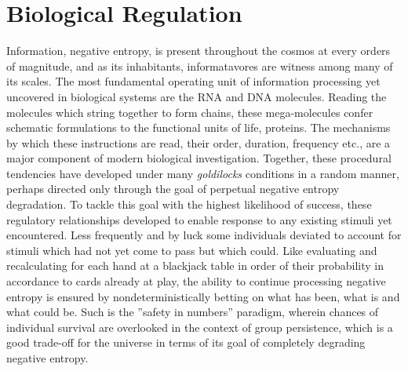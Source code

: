 \section{Biological Regulation}
\label{sec:bioreg}
Information, \ie negative entropy, is present throughout the cosmos at every orders of magnitude, and as its inhabitants, informatavores are witness among many of its scales. The most fundamental operating unit of information processing yet uncovered in biological systems are the RNA and DNA molecules. Reading the molecules which string together to form chains, these mega-molecules confer schematic formulations to the functional units of life, proteins. The mechanisms by which these instructions are read, \ie their order, duration, frequency etc., are a major component of modern biological investigation. Together, these procedural tendencies have developed under many \emph{goldilocks} conditions in a random manner, perhaps directed only through the goal of perpetual negative entropy degradation. To tackle this goal with the highest likelihood of success, these regulatory relationships developed to enable response to any existing stimuli yet encountered. Less frequently and by luck some individuals deviated to account for stimuli which had not yet come to pass but which could. Like evaluating and recalculating for each hand at a blackjack table in order of their probability in accordance to cards already at play, the ability to continue processing negative entropy is ensured by nondeterministically betting on what has been, what is and what could be. Such is the ''safety in numbers'' paradigm, wherein chances of individual survival are overlooked in the context of group persistence, which is a good trade-off for the universe in terms of its goal of completely degrading negative entropy.


